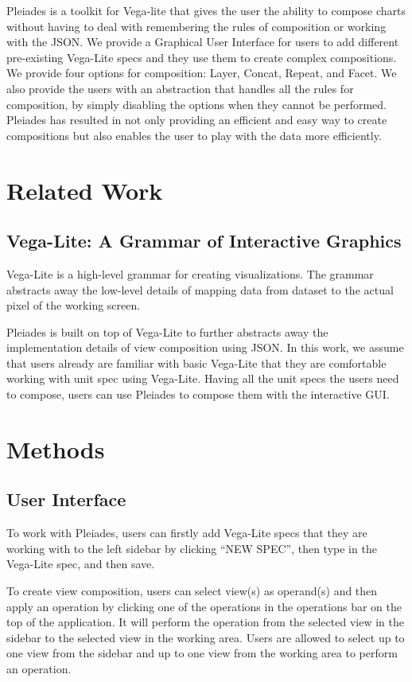 \documentclass[journal]{vgtc}                %
\begin{document}
Pleiades is a toolkit for Vega-lite that gives the user the ability to compose
charts without having to deal with remembering the rules of composition or working
with the JSON. We provide a Graphical User Interface for users to add different
pre-existing Vega-Lite specs and they use them to create complex compositions.
We provide four options for composition: Layer, Concat, Repeat, and Facet. We also
provide the users with an abstraction that handles all the rules for composition,
by simply disabling the options when they cannot be performed. Pleiades has resulted
in not only providing an efficient and easy way to create compositions but also
enables the user to play with the data more efficiently.

\section{Related Work}

\subsection{Vega-Lite: A Grammar of Interactive Graphics}
Vega-Lite is a high-level grammar for creating visualizations. The grammar abstracts
away the low-level details of mapping data from dataset to the actual pixel of the
working screen.

Pleiades is built on top of Vega-Lite to further abstracts away the implementation
details of view composition using JSON. In this work, we assume that users already
are familiar with basic Vega-Lite that they are comfortable working with unit spec
using Vega-Lite. Having all the unit specs the users need to compose, users can use
Pleiades to compose them with the interactive GUI.


\section{Methods}
\subsection{User Interface}

To work with Pleiades, users can firstly add Vega-Lite specs that they are working
with to the left sidebar by clicking ``NEW SPEC'', then type in the Vega-Lite spec,
and then save.

To create view composition, users can select view(s) as operand(s) and then apply
an operation by clicking one of the operations in the operations bar on the top of
the application. It will perform the operation from the selected view in the sidebar
to the selected view in the working area. Users are allowed to select up to one view
from the sidebar and up to one view from the working area to perform an operation.
\end{document}

